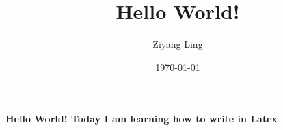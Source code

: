 \documentclass{article}
\title{Hello World!}
\author{Ziyang Ling}
\date{\today}
\begin{document}
\maketitle
\bf{Hello World!} Today I am learning how to write in Latex
\end{document}
